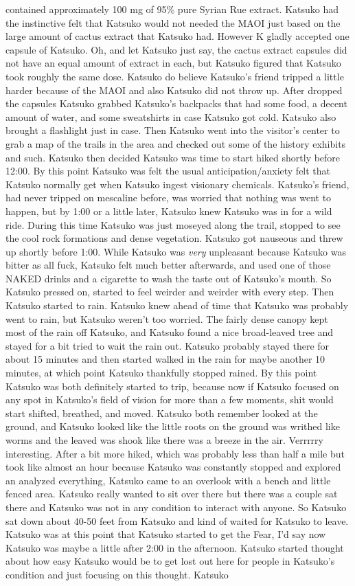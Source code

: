 \documentclass[12pt]{book}
\begin{document}
contained approximately 100 mg of 95\% pure Syrian Rue extract. Katsuko had the instinctive felt that Katsuko would not needed the MAOI just based on the large amount of cactus extract that Katsuko had. However K gladly accepted one capsule of Katsuko. Oh, and let Katsuko just say, the cactus extract capsules did not have an equal amount of extract in each, but Katsuko figured that Katsuko took roughly the same dose. Katsuko do believe Katsuko's friend tripped a little harder because of the MAOI and also Katsuko did not throw up. After dropped the capsules Katsuko grabbed Katsuko's backpacks that had some food, a decent amount of water, and some sweatshirts in case Katsuko got cold. Katsuko also brought a flashlight just in case. Then Katsuko went into the visitor's center to grab a map of the trails in the area and checked out some of the history exhibits and such. Katsuko then decided Katsuko was time to start hiked shortly before 12:00. By this point Katsuko was felt the usual anticipation/anxiety felt that Katsuko normally get when Katsuko ingest visionary chemicals. Katsuko's friend, had never tripped on mescaline before, was worried that nothing was went to happen, but by 1:00 or a little later, Katsuko knew Katsuko was in for a wild ride. During this time Katsuko was just moseyed along the trail, stopped to see the cool rock formations and dense vegetation. Katsuko got nauseous and threw up shortly before 1:00. While Katsuko was \emph{very} unpleasant because Katsuko was bitter as all fuck, Katsuko felt much better afterwards, and used one of those NAKED drinks and a cigarette to wash the taste out of Katsuko's mouth. So Katsuko pressed on, started to feel weirder and weirder with every step. Then Katsuko started to rain. Katsuko knew ahead of time that Katsuko was probably went to rain, but Katsuko weren't too worried. The fairly dense canopy kept most of the rain off Katsuko, and Katsuko found a nice broad-leaved tree and stayed for a bit tried to wait the rain out. Katsuko probably stayed there for about 15 minutes and then started walked in the rain for maybe another 10 minutes, at which point Katsuko thankfully stopped rained. By this point Katsuko was both definitely started to trip, because now if Katsuko focused on any spot in Katsuko's field of vision for more than a few moments, shit would start shifted, breathed, and moved. Katsuko both remember looked at the ground, and Katsuko looked like the little roots on the ground was writhed like worms and the leaved was shook like there was a breeze in the air. Verrrrry interesting. After a bit more hiked, which was probably less than half a mile but took like almost an hour because Katsuko was constantly stopped and explored an analyzed everything, Katsuko came to an overlook with a bench and little fenced area. Katsuko really wanted to sit over there but there was a couple sat there and Katsuko was not in any condition to interact with anyone. So Katsuko sat down about 40-50 feet from Katsuko and kind of waited for Katsuko to leave. Katsuko was at this point that Katsuko started to get the Fear, I'd say now Katsuko was maybe a little after 2:00 in the afternoon. Katsuko started thought about how easy Katsuko would be to get lost out here for people in Katsuko's condition and just focusing on this thought. Katsuko 
\end{document}
